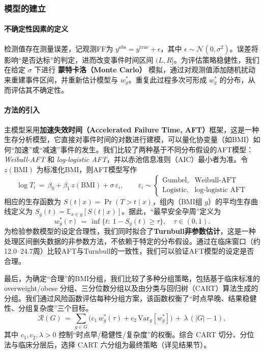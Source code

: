 \documentclass[withoutpreface]{cumcmthesis}
\begin{document}
\subsubsection{模型的建立}
\paragraph{不确定性因素的定义}
检测值存在测量误差，记观测FF为 $y^{\text{obs}}=y^{\text{true}}+\epsilon$，其中 $\epsilon\sim\mathcal N(0,\sigma^2)$。误差将影响“是否达标”的判定，进而改变事件时间区间 $(L,R]$。为评估策略稳健性，我们在给定 $\sigma$ 下进行 \textbf{蒙特卡洛（Monte Carlo）} 模拟，通过对观测值添加随机扰动来重建事件区间，并重新估计模型与 $w_g^{*}$。重复此过程多次可形成 $w_g^{*}$ 的分布，从而评估其不确定性。
\paragraph{方法的引入}
主模型采用\textbf{加速失效时间（Accelerated Failure Time, AFT）}框架，这是一种生存分析模型，它直接对事件时间的对数进行建模，可以量化协变量（如BMI）如何“加速”或“减速”事件的发生。我们比较了两种基于不同分布假设的AFT模型：\emph{Weibull-AFT} 和 \emph{log-logistic AFT}，并以赤池信息准则（AIC）最小者为准。令 $z(\mathrm{BMI})$ 为标准化BMI，则AFT模型写作
\[
\log T_i \,=\, \beta_0 + \beta_1\, z(\mathrm{BMI}) + \sigma\,\varepsilon_i,\qquad \varepsilon_i\sim\begin{cases}
\text{Gumbel}, & \text{Weibull-AFT}\\
\text{Logistic}, & \text{log-logistic AFT}\end{cases}
\]
相应的生存函数为 $S(t\mid x)=\Pr(T>t\mid x)$，组内（BMI组 $g$）的平均生存曲线定义为 $S_g(t)=\mathbb E_{x\in g}[S(t\mid x)]$。据此，“最早安全孕周”定义为
\[
w_g^{*}(\tau)\,=\,\inf\{t:\ 1-S_g(t)\ge \tau\},\quad \tau\in(0,1).
\]
为检验参数模型的设定合理性，我们同时拟合了\textbf{Turnbull非参数估计}，这是一种处理区间删失数据的非参数方法，不依赖于特定的分布假设。通过在临床窗口（约12.0–24.7周）比较AFT与Turnbull的一致性，我们可以验证AFT模型的设定是否合理。

最后，为确定“合理”的BMI分组，我们比较了多种分组策略，包括基于临床标准的 overweight/obese 分组、三分位数分组以及由分类与回归树（CART）算法生成的分组。我们通过风险函数评估每种分组方案，该函数权衡了“时点早晚、结果稳健性、分组复杂度”三个目标。
\[
\mathcal R(G)\,=\, \sum_{g\in G} \Big( c_1\,w_g^{*}(\tau)+c_2\,\mathrm{Var}_g[w_g^{*}]\Big)\,+\,\lambda\,(|G|-1),
\]
其中 $c_1,c_2,\lambda>0$ 控制“时点早/稳健性/复杂度”的权衡。综合 CART 切分、分位法与临床分层后，选择 CART 六分组为最终策略（详见结果节）。
\end{document}
